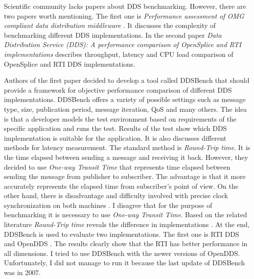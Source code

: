 \documentclass{csfourzero}
\begin{document}
Scientific community lacks papers about DDS benchmarking. However, there are two papers worth mentioning. The first one is \textit{Performance assessment of OMG compliant data distribution middleware} \cite{omg-perf}. It discusses the complexity of benchmarking different DDS implementations. In the second paper \textit{Data Distribution Service (DDS): A performance comparison of OpenSplice and RTI implementations} \cite{splice-vs-rti} describes throughput, latency and CPU load comparison of OpenSplice and RTI DDS implementations.

Authors of the first paper decided to develop a tool called DDSBench that should provide a framework for objective performance comparison of different DDS implementations. DDSBench offers a variety of possible settings such as message type, size, publication period, message iteration, QoS and many others. The idea is that a developer models the test environment based on requirements of the specific application and runs the test. Results of the test show which DDS implementation is suitable for the application. It is also discusses different methods for latency measurement. The standard method is \textit{Round-Trip time}. It is the time elapsed between sending a message and receiving it back. However, they decided to use \textit{One-way Transit Time} that represents time elapsed between sending the message from publisher to subscriber. The advantage is that it more accurately represents the elapsed time from subscriber's point of view. On the other hand, there is disadvantage and difficulty involved with precise clock synchronization on both machines  \cite{omg-perf}. I disagree that for the purpose of benchmarking it is necessary to use \textit{One-way Transit Time}. Based on the related literature \textit{Round-Trip time} reveals the difference in implementations \cite{perf-embedded}. At the end, DDSBench is used to evaluate two implementations. The first one is RTI DDS and OpenDDS \cite{omg-perf}. The results clearly show that the RTI has better performance in all dimensions. I tried to use DDSBench with the newer versions of OpenDDS. Unfortunately, I did not manage to run it because the last update of DDSBench was in 2007.
\end{document}
